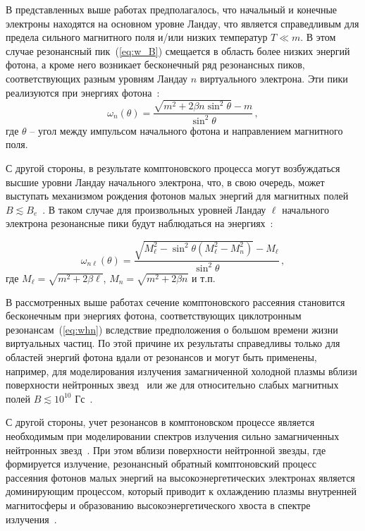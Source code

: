 \documentclass[cp1251%
               ]{jetp} %
\begin{document}
В представленных выше работах предполагалось, что начальный и конечные электроны находятся 
на основном уровне Ландау, что является справедливым для предела сильного магнитного поля 
и/или низких температур $T\ll m$. В этом случае резонансный 
пик~(\ref{eq:w_B})  смещается в область более низких энергий фотона, а кроме 
него возникает бесконечный ряд резонансных пиков, соответствующих разным 
уровням Ландау $n$ 
виртуального электрона. Эти пики реализуются при энергиях фотона~\cite{Daugherty:1986}:
\begin{equation}\label{eq:whn}
	\omega_n(\theta)= \frac{\sqrt{m^2+2 \beta n \sin^2\theta} - 
		m}{\sin^2\theta}\, ,
\end{equation}
где $\theta$ -- угол между импульсом начального фотона и направлением 
магнитного поля. 

С другой стороны, в результате комптоновского процесса могут возбуждаться 
высшие уровни Ландау начального электрона, что, в свою очередь, может выступать 
механизмом рождения фотонов малых энергий для магнитных полей $B\lesssim 
B_e$~\cite{Daugherty:1986,Bussard:1986}. В таком случае для произвольных уровней Ландау $\ell$ начального электрона резонансные 
пики будут наблюдаться на энергиях~\cite{Mushtukov:2016}:

\begin{equation}\label{eq:resAll}
	\omega_{n\ell}(\theta)=\frac{\sqrt{M_\ell^2 - \sin^2\theta (M_\ell^2-M_n^2)}-M_\ell}{\sin^2\theta}\, ,
\end{equation}
где $M_\ell=\sqrt{m^2+2\beta \ell}$, $M_n=\sqrt{m^2+2\beta n}$ и т.п.

В рассмотренных выше работах сечение комптоновского рассеяния 
становится бесконечным при энергиях фотона, соответствующих циклотронным 
резонансам~(\ref{eq:whn}) вследствие предположения о 
большом времени жизни виртуальных частиц. По этой причине их результаты 
справедливы только для областей энергий фотона вдали от резонансов
и могут быть применены, например, для моделирования излучения 
замагниченной 
	холодной плазмы вблизи поверхности нейтронных 
	звезд~\cite{Ozel:2001} или же для относительно слабых магнитных 
	полей $B\lesssim 10^{10}$ Гс~\cite{Zavlin:1996}.

С другой стороны, учет резонансов в комптоновском процессе является необходимым 
при моделировании спектров излучения сильно замагниченных нейтронных 
звезд~\cite{Alexander:1991,Araya:1999,Ho:2001,Lyutikov:2006,Potekhin:2004,Schonherr:2007,Nishimura:2008,Suleimanov:2009}.
При этом вблизи поверхности нейтронной звезды, где формируется излучение, резонансный 
обратный комптоновский процесс рассеяния фотонов малых энергий на высокоэнергетических электронах 
является доминирующим процессом, который приводит к охлаждению плазмы 
внутренней магнитосферы и образованию высокоэнергетического хвоста в спектре 
излучения~\cite{Fernandez:2007,Nobili:2008,Baring:2018,Beloborodov:2013}.
\end{document}
